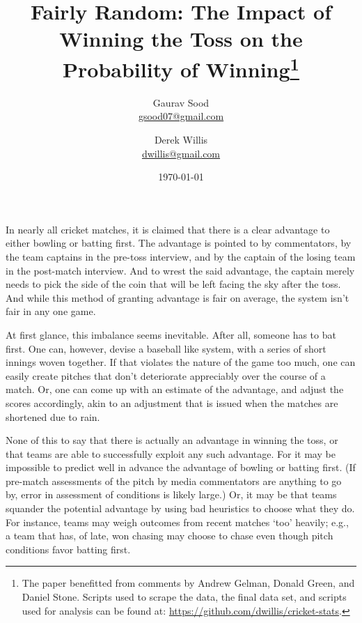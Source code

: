 \documentclass[12pt]{article}
\begin{document}
\title{\vspace{-.5cm}\normalsize{Fairly Random: The Impact of Winning the Toss on the Probability of Winning\footnote{The paper benefitted from comments by Andrew Gelman, Donald Green, and Daniel Stone. Scripts used to scrape the data, the final data set, and scripts used for analysis can be found at: \href{https://github.com/dwillis/cricket-stats}{https://github.com/dwillis/cricket-stats}. }\vspace{.5cm}}}
\author{\normalsize{Gaurav Sood}\\\href{mailto:gsood07@gmail.com}{\small{gsood07@gmail.com}} \and \normalsize{Derek Willis}\\\href{mailto:dwillis@gmail.com}{\small{dwillis@gmail.com}}}
\date{\vspace{.5cm}\normalsize{\today}}
\maketitle
\doublespacing

In nearly all cricket matches, it is claimed that there is a clear advantage to either bowling or batting first. The advantage is pointed to by commentators, by the team captains in the pre-toss interview, and by the captain of the losing team in the post-match interview. And to wrest the said advantage, the captain merely needs to pick the side of the coin that will be left facing the sky after the toss. And while this method of granting advantage is fair on average, the system isn't fair in any one game. 

At first glance, this imbalance seems inevitable. After all, someone has to bat first. One can, however, devise a baseball like system, with a series of short innings woven together. If that violates the nature of the game too much, one can easily create pitches that don't deteriorate appreciably over the course of a match. Or, one can come up with an estimate of the advantage, and adjust the scores accordingly, akin to an adjustment that is issued when the matches are shortened due to rain.

None of this to say that there is actually an advantage in winning the toss, or that teams are able to successfully exploit any such advantage. For it may be impossible to predict well in advance the advantage of bowling or batting first. (If pre-match assessments of the pitch by media commentators are anything to go by, error in assessment of conditions is likely large.) Or, it may be that teams squander the potential advantage by using bad heuristics to choose what they do. For instance, teams may weigh outcomes from recent matches `too' heavily; e.g., a team that has, of late, won chasing may choose to chase even though pitch conditions favor batting first.
\end{document}
